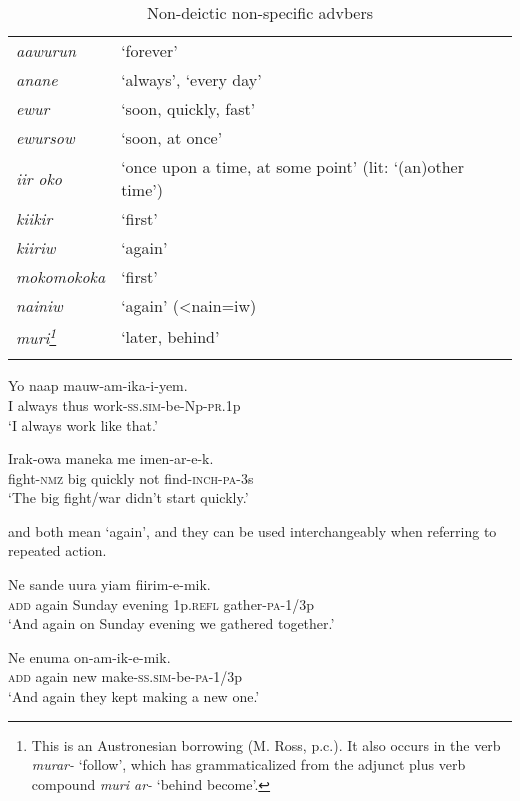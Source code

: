 \begin{table}
\begin{tabular}{>{\itshape}ll}
\mytoprule
aawurun &`forever'\\
anane &`always', `every day'\\
ewur &`soon, quickly, fast'\\
ewursow &`soon, at once'\\
iir oko &`once upon a time, at some point' (lit: `(an)other time')\\
kiikir &`first'\\
kiiriw &`again'\\
mokomokoka &`first'\\
nainiw &`again' ({{\textless}}nain=iw)\\
muri\footnote{This is an Austronesian borrowing (M. Ross, p.c.). It also occurs in the verb \textit{murar-} `follow', which has grammaticalized from the adjunct plus verb compound \textit{muri ar-} `behind become'.} &`later, behind'\\
\mybottomrule 
\end{tabular}
\caption{Non-deictic non-specific advbers}
\label{tab:3:nondeicticnonspecific}
\end{table}

\ea%
\label{ex:3:x502}
\gll Yo  naap mauw-am-ika-i-yem. \\
I always thus work-\textsc{ss}.\textsc{sim}-be-Np-\textsc{pr}.1p\\
\glt`I always work like that.'
\z

\ea%
\label{ex:3:x504}
\gll Irak-owa maneka  me imen-ar-e-k. \\
fight-\textsc{nmz} big quickly not find-\textsc{inch}-\textsc{pa}-3s\\
\glt`The big fight/war didn't start quickly.'
\z

 and  both mean `again', and they can be used interchangeably when referring to repeated action.

\ea%
\label{ex:3:x697}
\gll Ne  sande uura yiam fiirim-e-mik. \\
\textsc{add} again Sunday evening 1p.\textsc{refl} gather-\textsc{pa}-1/3p\\
\glt`And again on Sunday evening we gathered together.'
\z

\ea%
\label{ex:3:x1762}
\gll Ne  enuma on-am-ik-e-mik. \\
\textsc{add} again new make-\textsc{ss}.\textsc{sim}-be-\textsc{pa}-1/3p\\
\glt`And again they kept making a new one.'
\z

